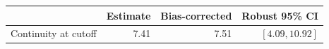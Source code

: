 \begin{center}
\small\renewcommand{\arraystretch}{1.3}
\begin{tabular}{@{}lrrr@{}}\toprule
 & Estimate & Bias-corrected & Robust 95\% CI\\\midrule
Continuity at cutoff & 7.41 & 7.51 & $[4.09, 10.92]$\\
\bottomrule\end{tabular}
\end{center}
